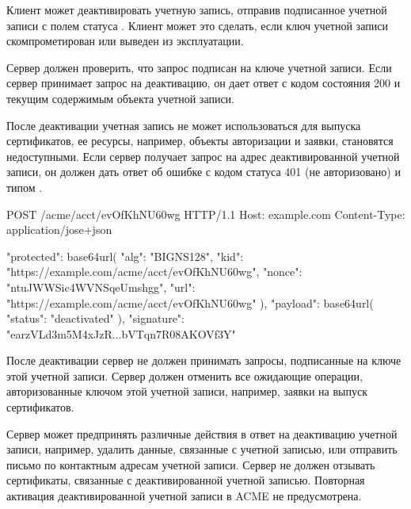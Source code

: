 Клиент может деактивировать учетную запись, отправив подписанное 
 учетной записи с полем статуса 
. Клиент может это сделать, если ключ учетной записи 
скомпрометирован или выведен из эксплуатации.

Сервер должен проверить, что запрос подписан на ключе учетной записи. 
Если сервер принимает запрос на деактивацию, он дает ответ с кодом состояния 
200 и текущим содержимым объекта учетной записи. 

После деактивации учетная запись не может использоваться для выпуска 
сертификатов, ее ресурсы, например, объекты авторизации и заявки, становятся
недоступными. 
%
Если сервер получает запрос на адрес деактивированной учетной записи, 
он должен дать ответ об ошибке с кодом статуса 401 (не авторизовано) и типом 
.  

\begin{codeblock}
POST /acme/acct/evOfKhNU60wg HTTP/1.1
Host: example.com
Content-Type: application/jose+json

{
  "protected": base64url({
    "alg": "BIGNS128",
    "kid": "https://example.com/acme/acct/evOfKhNU60wg",
    "nonce": "ntuJWWSic4WVNSqeUmshgg",
    "url": "https://example.com/acme/acct/evOfKhNU60wg"
  }),
  "payload": base64url({
    "status": "deactivated"
  }),
  "signature": "earzVLd3m5M4xJzR...bVTqn7R08AKOVf3Y"
}
\end{codeblock}
\fi

После деактивации сервер не должен принимать запросы, подписанные на ключе этой 
учетной записи. Сервер должен отменить все ожидающие операции, авторизованные 
ключом этой учетной записи, например, заявки на выпуск сертификатов. 

Сервер может предпринять различные действия в ответ на деактивацию учетной
записи, например, удалить данные, связанные с учетной записью, или
отправить письмо по контактным адресам учетной записи. Сервер не должен отзывать
сертификаты, связанные с деактивированной учетной записью.
%
Повторная активация деактивированной учетной записи в ACME не предусмотрена. 
